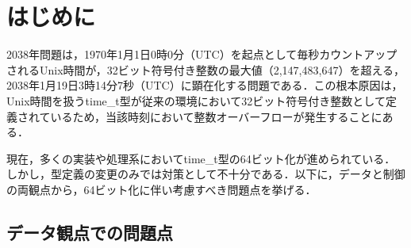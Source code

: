 \documentclass[submit,techrep,noauthor]{ipsj}
\begin{document}


\maketitle

\section{はじめに}

2038年問題は，1970年1月1日0時0分（UTC）を起点として毎秒カウントアップされるUnix時間が，32ビット符号付き整数の最大値（2,147,483,647）を超える，2038年1月19日3時14分7秒（UTC）に顕在化する問題である．この根本原因は，Unix時間\cite{ref1}を扱うtime\_t型\cite{ref2}が従来の環境において32ビット符号付き整数として定義されているため，当該時刻において整数オーバーフローが発生することにある．

現在，多くの実装や処理系においてtime\_t型の64ビット化が進められている．しかし，型定義の変更のみでは対策として不十分である．以下に，データと制御の両観点から，64ビット化に伴い考慮すべき問題点を挙げる．

\subsection{データ観点での問題点}
\end{document}
